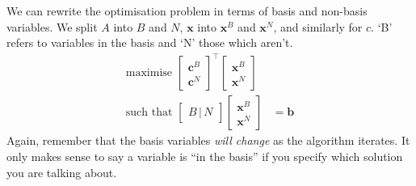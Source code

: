 \documentclass[12pt,a4paper]{article} %
\begin{document}
We can rewrite the optimisation problem in terms of basis
and non-basis variables. We split $A$ into $B$ and $N$,  
$\bm x$ into $\bm x^B$ and $\bm x^N$, and similarly for $c$. 
`B' refers to variables in the basis and `N' those which aren't.
\begin{align*}
    \text{maximise }\begin{bmatrix}
        \bm c^B \\ \bm c^N
    \end{bmatrix}^\top \begin{bmatrix}
        \bm x^B \\ \bm x^N
    \end{bmatrix} &\\ 
    \text{such that }\begin{bmatrix}
        B\,|\,N
    \end{bmatrix}\begin{bmatrix}
        \bm x^B \\ \bm x^N
    \end{bmatrix} &= \bm b
\end{align*} 
Again, remember that the basis variables \textit{will change} as the algorithm 
iterates. It only makes sense to say a variable is ``in the basis'' if you 
specify which solution you are talking about. 
\end{document}
